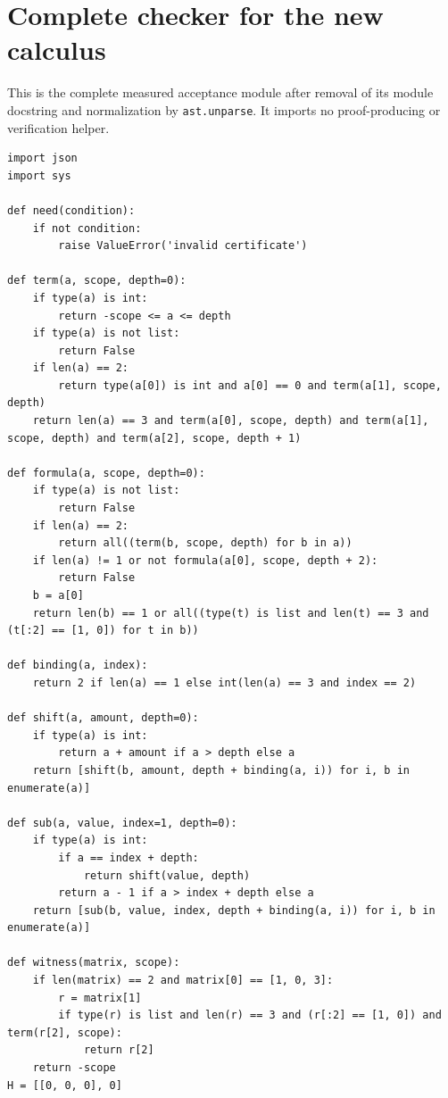 \documentclass[11pt,letterpaper]{article}
\theoremstyle{definition}\newtheorem{definition}[theorem]{Definition}
\theoremstyle{remark}\newtheorem{remark}[theorem]{Remark}
\begin{document}
\clearpage
\section{Complete checker for the new calculus}
This is the complete measured acceptance module after removal of its module docstring and normalization by \texttt{ast.unparse}. It imports no proof-producing or verification helper.
\begin{lstlisting}
import json
import sys

def need(condition):
    if not condition:
        raise ValueError('invalid certificate')

def term(a, scope, depth=0):
    if type(a) is int:
        return -scope <= a <= depth
    if type(a) is not list:
        return False
    if len(a) == 2:
        return type(a[0]) is int and a[0] == 0 and term(a[1], scope, depth)
    return len(a) == 3 and term(a[0], scope, depth) and term(a[1], scope, depth) and term(a[2], scope, depth + 1)

def formula(a, scope, depth=0):
    if type(a) is not list:
        return False
    if len(a) == 2:
        return all((term(b, scope, depth) for b in a))
    if len(a) != 1 or not formula(a[0], scope, depth + 2):
        return False
    b = a[0]
    return len(b) == 1 or all((type(t) is list and len(t) == 3 and (t[:2] == [1, 0]) for t in b))

def binding(a, index):
    return 2 if len(a) == 1 else int(len(a) == 3 and index == 2)

def shift(a, amount, depth=0):
    if type(a) is int:
        return a + amount if a > depth else a
    return [shift(b, amount, depth + binding(a, i)) for i, b in enumerate(a)]

def sub(a, value, index=1, depth=0):
    if type(a) is int:
        if a == index + depth:
            return shift(value, depth)
        return a - 1 if a > index + depth else a
    return [sub(b, value, index, depth + binding(a, i)) for i, b in enumerate(a)]

def witness(matrix, scope):
    if len(matrix) == 2 and matrix[0] == [1, 0, 3]:
        r = matrix[1]
        if type(r) is list and len(r) == 3 and (r[:2] == [1, 0]) and term(r[2], scope):
            return r[2]
    return -scope
H = [[0, 0, 0], 0]


\end{lstlisting}
\end{document}
